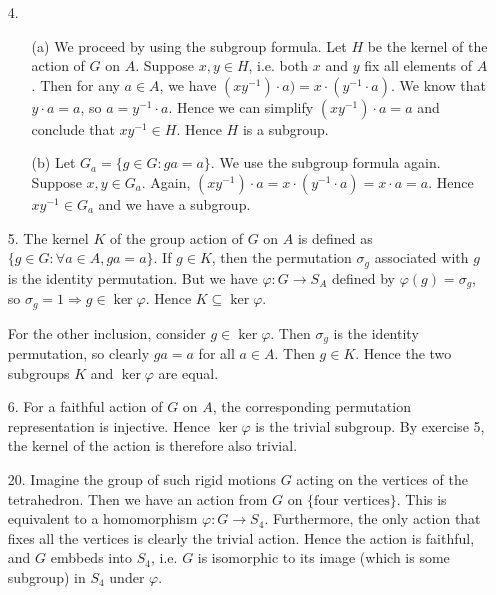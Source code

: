 \documentclass[12pt]{article}
\theoremstyle{remark}
\theoremstyle{named}
\renewcommand{\implies}{\Rightarrow}
\begin{document}
\begin{enumerate}
    \item [4.] 
    \begin{enumerate}
        \item [(a)] We proceed by using the subgroup formula. Let \(H\) be the kernel of the action of \(G\) on \(A\). Suppose \(x, y \in H\), i.e. both \(x\) and \(y\) fix all elements of \(A\). Then for any \(a \in A\), we have \((xy^{-1}) \cdot a) = x \cdot (y^{-1} \cdot a)\). We know that \(y \cdot a = a\), so \(a = y^{-1} \cdot a\). Hence we can simplify \((xy^{-1})\cdot a = a\) and conclude that \(xy^{-1} \in H\). Hence \(H\) is a subgroup.
        \item [(b)] Let \(G_a = \{g \in G : ga = a\}\). We use the subgroup formula again. Suppose \(x, y \in G_a\). Again, \((xy^{-1}) \cdot a = x \cdot (y^{-1} \cdot a) = x \cdot a = a\). Hence \(xy^{-1} \in G_a\) and we have a subgroup. 
    \end{enumerate}

    \item [5.] The kernel \(K\) of the group action of \(G\) on \(A\) is defined as \(\{g \in G : \forall a \in A, ga = a\}\). If \(g \in K\), then the permutation \(\sigma_g\) associated with \(g\) is the identity permutation. But we have \(\varphi : G \to S_A\) defined by \(\varphi(g) = \sigma_g\), so \(\sigma_g = 1 \implies g \in \ker \varphi\). Hence \(K \subseteq \ker \varphi\).
    
    For the other inclusion, consider \(g \in \ker \varphi\). Then \(\sigma_g\) is the identity permutation, so clearly \(ga = a\) for all \(a \in A\). Then \(g \in K\). Hence the two subgroups \(K\) and \(\ker \varphi\) are equal.

    \item [6.] For a faithful action of \(G\) on \(A\), the corresponding permutation representation is injective. Hence \(\ker \varphi\) is the trivial subgroup. By exercise 5, the kernel of the action is therefore also trivial.
    
    \item [20.] Imagine the group of such rigid motions \(G\) acting on the vertices of the tetrahedron. Then we have an action from \(G\) on \(\{\text{four vertices}\}\). This is equivalent to a homomorphism \(\varphi : G \to S_4\). Furthermore, the only action that fixes all the vertices is clearly the trivial action. Hence the action is faithful, and \(G\) embbeds into \(S_4\), i.e. \(G\) is isomorphic to its image (which is some subgroup) in \(S_4\) under \(\varphi\).
    

\end{enumerate}
\end{document}
